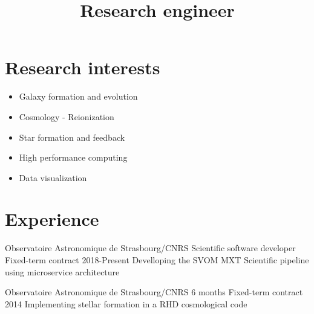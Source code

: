 \documentclass[11pt,a4paper,sans]{moderncv}
\title{Research engineer}
\newcommand{\aton}{{\texttt{ATON}}}
\begin{document}
\makecvtitle


\section{Research interests}
%
%
\begin{itemize}[label=--,leftmargin=1cm ,parsep=0cm,itemsep=0cm,topsep=0cm]
\item Galaxy formation and evolution
\item Cosmology - Reionization
\item Star formation and feedback
\item High performance computing
\item Data visualization
\end{itemize}


\section{Experience}

\cventry
{Observatoire Astronomique de Strasbourg/CNRS}
{Scientific software developer}
{Fixed-term contract}
{2018-Present}
{}
{}
{Develloping the SVOM MXT Scientific pipeline using microservice architecture}


\cventry
{Observatoire Astronomique de Strasbourg/CNRS}
{6 months}
{Fixed-term contract}
{2014}
{}
{}
{Implementing stellar formation in a RHD cosmological code}


\end{document}
